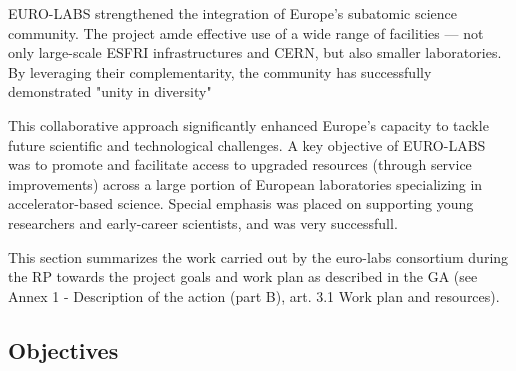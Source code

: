 EURO-LABS  strengthened the integration of Europe’s subatomic science community. The project amde effective use of a wide range of facilities — not only large-scale ESFRI infrastructures and CERN, but also smaller laboratories. By leveraging their complementarity, the community has successfully demonstrated "unity in diversity" 

This collaborative approach significantly enhanced Europe’s capacity to tackle future scientific and technological challenges. A key objective of EURO-LABS was to promote and facilitate access to upgraded resources (through service improvements) across a large portion of European laboratories specializing in accelerator-based science. Special emphasis was placed on supporting young researchers and early-career scientists, and was very successfull.

This section summarizes the work carried out by the \acrshort{euro-labs} consortium during the  \acrshort{RP} towards the project goals and work plan as described in the \acrfull{GA} (see Annex 1 - Description of the action (part B), art. 3.1 Work plan and resources).

\subsection{Objectives}

